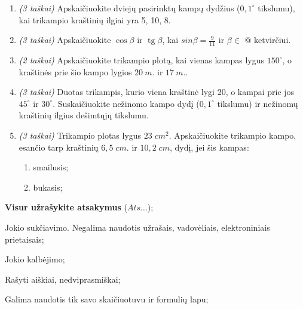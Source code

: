 \documentclass[a4paper]{article}
\makeatletter
\DeclareMathOperator{\tg}{tg}
\newcommand*{\rom}[1]{\expandafter\@slowromancap\romannumeral #1@}
\makeatother
\begin{document}
\begin{enumerate}

      \item \textit{(3 taškai)} Apskaičiuokite dviejų pasirinktų kampų dydžius
            ($0,1^\circ$
            tikslumu), kai trikampio kraštinių ilgiai yra 5, 10, 8.

      \item \textit{(3 taškai)} Apskaičiuokite $\cos\beta$ ir $\tg \beta$, kai
            $sin \beta = \frac{9}{11}$ ir $\beta \in$ \rom{2} ketvirčiui.

      \item \textit{(2 taškai)} Apskaičiuokite trikampio plotą, kai vienas
            kampas lygus
            $150^\circ$, o kraštinės prie šio kampo lygios
            $20\:m.$ ir $17\:m.$.

      \item \textit{(3 taškai)} Duotas trikampis, kurio viena kraštinė lygi 20,
            o kampai prie jos
            $45^\circ$ ir $30^\circ$. Suskaičiuokite nežinomo kampo dydį
            ($0,1^\circ$ tikslumu) ir
            nežinomų kraštinių ilgius dešimtųjų tikslumu.

      \item \textit{(3 taškai)} Trikampio plotas lygus $23\; cm^{2}$.
            Apskaičiuokite trikampio kampo, esančio tarp kraštinių $6,5\; cm.$
            ir $10,2\;
                  cm$, dydį, jei šis kampas:
            \begin{enumerate}[label= (\alph*)]
                  \item smailusis;
                  \item bukasis;
            \end{enumerate}

\end{enumerate}

\begin{small}
      \begin{enumerate*}[label={(\arabic*)}]
            \item \textbf{Visur užrašykite atsakymus} ($Ats\ldots$);
            \item Jokio sukčiavimo. Negalima naudotis užrašais, vadovėliais,
            elektroniniais prietaisais;
            \item Jokio kalbėjimo;
            \item Rašyti aiškiai, nedviprasmiškai;
            \item Galima naudotis tik savo skaičiuotuvu ir formulių lapu;
      \end{enumerate*}
\end{small}
\end{document}

